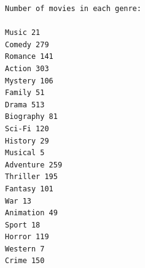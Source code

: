 \documentclass[11pt]{article}
\begin{document}
    \begin{Verbatim}[commandchars=\\\{\}]
Number of movies in each genre: 

Music 21
Comedy 279
Romance 141
Action 303
Mystery 106
Family 51
Drama 513
Biography 81
Sci-Fi 120
History 29
Musical 5
Adventure 259
Thriller 195
Fantasy 101
War 13
Animation 49
Sport 18
Horror 119
Western 7
Crime 150

    \end{Verbatim}

    \begin{center}
    \end{center}
    { \hspace*{\fill} \\}
    
    \begin{center}
    \end{center}
    { \hspace*{\fill} \\}
    
    \begin{center}
    \end{center}
    { \hspace*{\fill} \\}
    
    \begin{center}
    \end{center}
    { \hspace*{\fill} \\}
    
    \begin{center}
    \end{center}
    { \hspace*{\fill} \\}
    
    \begin{center}
    \end{center}
    { \hspace*{\fill} \\}
    
\end{document}
